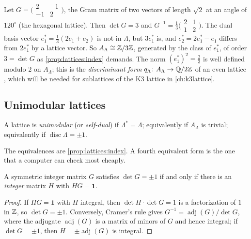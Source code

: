 \begin{example}\label{ex:lattices:A2}
Let $G=\bigl(\begin{smallmatrix}2&-1\\-1&2\end{smallmatrix}\bigr)$, the Gram matrix of two
vectors of length $\sqrt2$ at an angle of $120^\circ$ (the hexagonal lattice). Then
$\det G=3$ and $G^{-1}=\frac13\bigl(\begin{smallmatrix}2&1\\1&2\end{smallmatrix}\bigr)$. The
dual basis vector $e_1^*=\frac13(2e_1+e_2)$ is not in $\Lambda$, but $3e_1^*$ is, and
$e_2^*=2e_1^*-e_1$ differs from $2e_1^*$ by a lattice vector. So
$A_\Lambda\cong\mathbb{Z}/3\mathbb{Z}$, generated by the class of $e_1^*$, of order $3=\det G$ as
\cref{prop:lattices:index} demands. The norm $(e_1^*)^2=\frac23$ is well defined modulo $2$
on $A_\Lambda$; this is the \emph{discriminant form} $q_\Lambda\colon A_\Lambda\to\mathbb{Q}/2\mathbb{Z}$ of
an even lattice , which will be needed for sublattices
of the K3 lattice in \cref{ch:k3lattice}.
\end{example}

\subsection{Unimodular lattices}
\begin{definition}\label{def:lattices:unimodular}
A lattice is \emph{unimodular} (or
\emph{self-dual}) if $\Lambda^*=\Lambda$; equivalently if $A_\Lambda$
is trivial; equivalently if $\operatorname{disc}\Lambda=\pm1$.
\end{definition}

The equivalences are \cref{prop:lattices:index}. A fourth equivalent form is the one that a
computer can check most cheaply.

\begin{lemma}\label{lem:lattices:certificate}
A symmetric integer matrix $G$ satisfies $\det G=\pm1$ if and only if there is an
\emph{integer} matrix $H$ with $HG=\mathbf 1$.
\end{lemma}
\begin{proof}
If $HG=\mathbf 1$ with $H$ integral, then $\det H\cdot\det G=1$ is a factorization of $1$ in
$\mathbb{Z}$, so $\det G=\pm1$. Conversely, Cramer's rule gives $G^{-1}=\operatorname{adj}(G)/\det G$,
where the adjugate $\operatorname{adj}(G)$ is a matrix of minors of $G$ and hence integral; if
$\det G=\pm1$, then $H=\pm\operatorname{adj}(G)$ is integral.
\end{proof}

